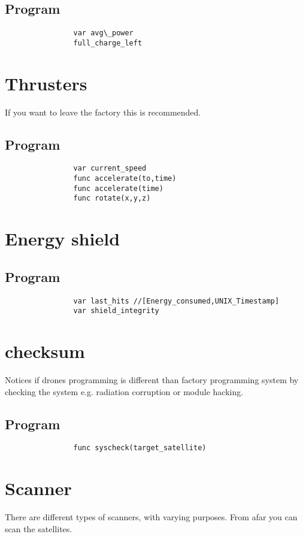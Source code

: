 \documentclass[a4paper]{scrreprt}
\begin{document}
        \subsection{Program}
            \begin{verbatim}
                var avg\_power
                full_charge_left
            \end{verbatim}
    \section{Thrusters}
        If you want to leave the factory this is recommended.
        \subsection{Program}
            \begin{verbatim}
                var current_speed
                func accelerate(to,time)
                func accelerate(time)
                func rotate(x,y,z)
            \end{verbatim}
    \section{Energy shield}
        \subsection{Program}
            \begin{verbatim}
                var last_hits //[Energy_consumed,UNIX_Timestamp]
                var shield_integrity
            \end{verbatim}
    \section{checksum}
        Notices if drones programming is different than factory programming system by checking the system e.g. radiation corruption or module hacking.
        \subsection{Program}
            \begin{verbatim}
                func syscheck(target_satellite)
            \end{verbatim}
    \section{Scanner}
        There are different types of scanners, with varying purposes.
        From afar you can scan the satellites. 
\end{document}
